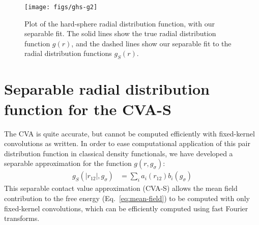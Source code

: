 \documentclass[letterpaper,twocolumn,amsmath,amssymb,pre,aps,10pt]{revtex4-1}
\begin{document}
\begin{figure}
  \centering
  \texttt{[image: figs/ghs-g2]}%
  \caption{Plot of the hard-sphere radial distribution function, with
    our separable fit.  The solid lines show the true radial
    distribution function $g(r)$, and the dashed lines show our
    separable fit to the radial distribution functions
    $g_S(r)$.}\label{fig:radial-distribution}
\end{figure}

\section{Separable radial distribution function for the CVA-S}

The CVA is quite accurate, but cannot be computed efficiently
with fixed-kernel convolutions as written.  In order to ease
computational application of this pair distribution function in
classical density functionals, we have developed a separable
approximation for the function $g(r,g_\sigma)$:
\begin{align}
  g_S(|r_{12}|, g_\sigma) &= \sum_{i} a_i(r_{12}) b_i(g_\sigma)
\end{align}
This separable contact value approximation (CVA-S) allows the mean
field contribution to the free energy (Eq.~\ref{eq:mean-field}) to be
computed with only fixed-kernel convolutions, which can be
efficiently computed using fast Fourier transforms.

\end{document}
